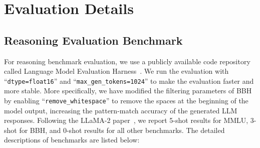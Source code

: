 \documentclass{article}
\theoremstyle{plain}
\theoremstyle{definition}
\theoremstyle{remark}
\begin{document}

\vspace{-2mm}
\section{Evaluation Details}\label{sec:evaluation-benchmark-details}
\vspace{-2mm}
\subsection{Reasoning Evaluation Benchmark}
For reasoning benchmark evaluation,  we use a publicly available code repository called Language Model Evaluation Harness~\citep{eval-harness}.%
We run the evaluation with ``\texttt{dtype=float16}'' and ``\texttt{max\_gen\_tokens=1024}'' to make the evaluation faster and more stable.
More specifically, we have modified the filtering parameters of BBH by enabling ``\texttt{remove\_whitespace}'' to remove the spaces at the beginning of the model output, increasing the pattern-match accuracy of the generated LLM responses.
Following the LLaMA-2 paper~\citep{touvron2023llama}, we report 5-shot results for MMLU, 3-shot for BBH, and 0-shot results for all other benchmarks. The detailed descriptions of benchmarks are listed below:
\end{document}
